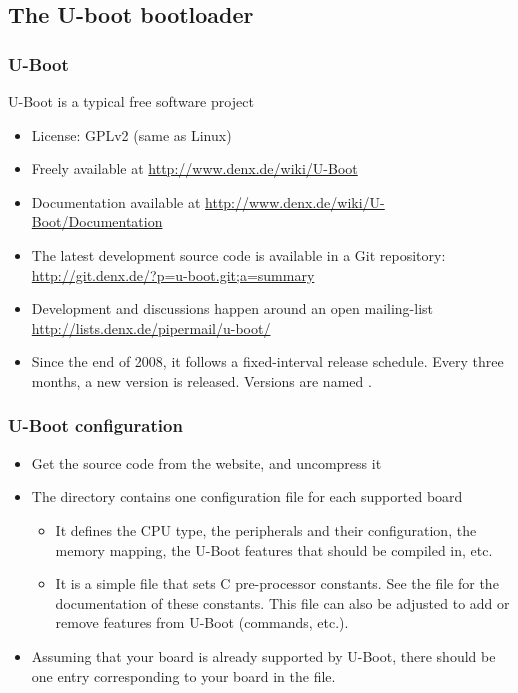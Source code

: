 \subsection{The U-boot bootloader}

\begin{frame}
  \frametitle{U-Boot}
  U-Boot is a typical free software project
  \begin{itemize}
  \item License: GPLv2 (same as Linux)
  \item Freely available at \url{http://www.denx.de/wiki/U-Boot}
  \item Documentation available at
    \url{http://www.denx.de/wiki/U-Boot/Documentation}
  \item The latest development source code is available in a Git
    repository:
    \url{http://git.denx.de/?p=u-boot.git;a=summary}
  \item Development and discussions happen around an open mailing-list
    \url{http://lists.denx.de/pipermail/u-boot/}
  \item Since the end of 2008, it follows a fixed-interval release
    schedule. Every three months, a new version is released. Versions
    are named .
\end{itemize}
\end{frame}

\begin{frame}
  \frametitle{U-Boot configuration}
  \begin{itemize}
  \item Get the source code from the website, and uncompress it
  \item The  directory contains one
    configuration file for each supported board
    \begin{itemize}
    \item It defines the CPU type, the peripherals and their configuration, the
      memory mapping, the U-Boot features that should be compiled in, etc.
    \item It is a simple  file that sets C pre-processor
      constants. See the  file for the documentation of
      these constants. This file can also be adjusted to add or remove
      features from U-Boot (commands, etc.).
    \end{itemize}
  \item Assuming that your board is already supported by U-Boot, there
    should be one entry corresponding to your board in the
     file.
  \end{itemize}
\end{frame}

